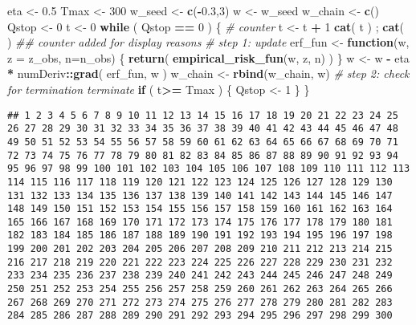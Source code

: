 \documentclass[
]{article}
\newenvironment{Shaded}{\begin{snugshade}}{\end{snugshade}}
\newcommand{\CommentTok}[1]{\textcolor[rgb]{0.56,0.35,0.01}{\textit{#1}}}
\newcommand{\ControlFlowTok}[1]{\textcolor[rgb]{0.13,0.29,0.53}{\textbf{#1}}}
\newcommand{\DataTypeTok}[1]{\textcolor[rgb]{0.13,0.29,0.53}{#1}}
\newcommand{\DecValTok}[1]{\textcolor[rgb]{0.00,0.00,0.81}{#1}}
\newcommand{\FloatTok}[1]{\textcolor[rgb]{0.00,0.00,0.81}{#1}}
\newcommand{\KeywordTok}[1]{\textcolor[rgb]{0.13,0.29,0.53}{\textbf{#1}}}
\newcommand{\NormalTok}[1]{#1}
\newcommand{\OperatorTok}[1]{\textcolor[rgb]{0.81,0.36,0.00}{\textbf{#1}}}
\newcommand{\StringTok}[1]{\textcolor[rgb]{0.31,0.60,0.02}{#1}}
\begin{document}
\begin{Shaded}
\begin{Highlighting}[]
\NormalTok{eta \textless{}{-}}\StringTok{ }\FloatTok{0.5}
\NormalTok{Tmax \textless{}{-}}\StringTok{ }\DecValTok{300}
\NormalTok{w\_seed \textless{}{-}}\StringTok{ }\KeywordTok{c}\NormalTok{(}\OperatorTok{{-}}\FloatTok{0.3}\NormalTok{,}\DecValTok{3}\NormalTok{)}
\NormalTok{w \textless{}{-}}\StringTok{ }\NormalTok{w\_seed}
\NormalTok{w\_chain \textless{}{-}}\StringTok{ }\KeywordTok{c}\NormalTok{()}
\NormalTok{Qstop \textless{}{-}}\StringTok{ }\DecValTok{0} 
\NormalTok{t \textless{}{-}}\StringTok{ }\DecValTok{0}
\ControlFlowTok{while}\NormalTok{ ( Qstop }\OperatorTok{==}\StringTok{ }\DecValTok{0}\NormalTok{ ) \{}
  \CommentTok{\# counter}
\NormalTok{  t \textless{}{-}}\StringTok{ }\NormalTok{t }\OperatorTok{+}\StringTok{  }\DecValTok{1}
  \KeywordTok{cat}\NormalTok{( t ) ; }\KeywordTok{cat}\NormalTok{( }\StringTok{\textquotesingle{} \textquotesingle{}}\NormalTok{ ) }\CommentTok{\#\# counter added for display reasons}
  \CommentTok{\# step 1: update  }
\NormalTok{  erf\_fun \textless{}{-}}\StringTok{ }\ControlFlowTok{function}\NormalTok{(w, }\DataTypeTok{z =}\NormalTok{ z\_obs, }\DataTypeTok{n=}\NormalTok{n\_obs) \{}
    \KeywordTok{return}\NormalTok{( }\KeywordTok{empirical\_risk\_fun}\NormalTok{(w, z, n) ) }
\NormalTok{  \}}
\NormalTok{  w \textless{}{-}}\StringTok{ }\NormalTok{w }\OperatorTok{{-}}\StringTok{ }\NormalTok{eta }\OperatorTok{*}\StringTok{ }\NormalTok{numDeriv}\OperatorTok{::}\KeywordTok{grad}\NormalTok{( erf\_fun, w )}
\NormalTok{  w\_chain \textless{}{-}}\StringTok{ }\KeywordTok{rbind}\NormalTok{(w\_chain, w)}
  \CommentTok{\# step 2: check for termination terminate}
  \ControlFlowTok{if}\NormalTok{ ( t}\OperatorTok{\textgreater{}=}\StringTok{ }\NormalTok{Tmax ) \{}
\NormalTok{    Qstop \textless{}{-}}\StringTok{ }\DecValTok{1}
\NormalTok{  \}}
\NormalTok{\}}
\end{Highlighting}
\end{Shaded}

\begin{verbatim}
## 1 2 3 4 5 6 7 8 9 10 11 12 13 14 15 16 17 18 19 20 21 22 23 24 25 26 27 28 29 30 31 32 33 34 35 36 37 38 39 40 41 42 43 44 45 46 47 48 49 50 51 52 53 54 55 56 57 58 59 60 61 62 63 64 65 66 67 68 69 70 71 72 73 74 75 76 77 78 79 80 81 82 83 84 85 86 87 88 89 90 91 92 93 94 95 96 97 98 99 100 101 102 103 104 105 106 107 108 109 110 111 112 113 114 115 116 117 118 119 120 121 122 123 124 125 126 127 128 129 130 131 132 133 134 135 136 137 138 139 140 141 142 143 144 145 146 147 148 149 150 151 152 153 154 155 156 157 158 159 160 161 162 163 164 165 166 167 168 169 170 171 172 173 174 175 176 177 178 179 180 181 182 183 184 185 186 187 188 189 190 191 192 193 194 195 196 197 198 199 200 201 202 203 204 205 206 207 208 209 210 211 212 213 214 215 216 217 218 219 220 221 222 223 224 225 226 227 228 229 230 231 232 233 234 235 236 237 238 239 240 241 242 243 244 245 246 247 248 249 250 251 252 253 254 255 256 257 258 259 260 261 262 263 264 265 266 267 268 269 270 271 272 273 274 275 276 277 278 279 280 281 282 283 284 285 286 287 288 289 290 291 292 293 294 295 296 297 298 299 300
\end{verbatim}
\end{document}
